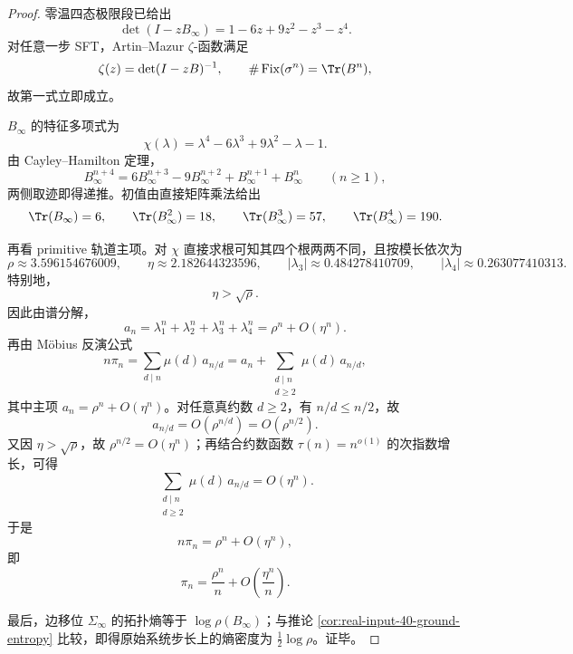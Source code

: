 \begin{proof}
零温四态极限段已给出
\[
\det(I-zB_\infty)=1-6z+9z^2-z^3-z^4.
\]
对任意一步 SFT，Artin--Mazur \(\zeta\)-函数满足
\[
\zeta(z)=\det(I-zB)^{-1},
\qquad
\#\operatorname{Fix}(\sigma^n)=\Tr(B^n),
\]
故第一式立即成立。

\(B_\infty\) 的特征多项式为
\[
\chi(\lambda)=\lambda^4-6\lambda^3+9\lambda^2-\lambda-1.
\]
由 Cayley--Hamilton 定理，
\[
B_\infty^{n+4}=6B_\infty^{n+3}-9B_\infty^{n+2}+B_\infty^{n+1}+B_\infty^{n}
\qquad(n\ge 1),
\]
两侧取迹即得递推。初值由直接矩阵乘法给出
\[
\Tr(B_\infty)=6,\qquad
\Tr(B_\infty^2)=18,\qquad
\Tr(B_\infty^3)=57,\qquad
\Tr(B_\infty^4)=190.
\]

再看 primitive 轨道主项。对 \(\chi\) 直接求根可知其四个根两两不同，且按模长依次为
\[
\rho\approx 3.596154676009,\qquad
\eta\approx 2.182644323596,\qquad
|\lambda_3|\approx 0.484278410709,\qquad
|\lambda_4|\approx 0.263077410313.
\]
特别地，
\[
\eta>\sqrt{\rho}.
\]
因此由谱分解，
\[
a_n=\lambda_1^n+\lambda_2^n+\lambda_3^n+\lambda_4^n
=
\rho^n+O(\eta^n).
\]
再由 Möbius 反演公式
\[
n\pi_n=\sum_{d\mid n}\mu(d)\,a_{n/d}
=
a_n+\sum_{\substack{d\mid n\\ d\ge 2}}\mu(d)\,a_{n/d},
\]
其中主项 \(a_n=\rho^n+O(\eta^n)\)。对任意真约数 \(d\ge 2\)，有 \(n/d\le n/2\)，故
\[
a_{n/d}=O(\rho^{n/d})=O(\rho^{n/2}).
\]
又因 \(\eta>\sqrt{\rho}\)，故 \(\rho^{n/2}=O(\eta^n)\)；再结合约数函数 \(\tau(n)=n^{o(1)}\) 的次指数增长，可得
\[
\sum_{\substack{d\mid n\\ d\ge 2}}\mu(d)\,a_{n/d}=O(\eta^n).
\]
于是
\[
n\pi_n=\rho^n+O(\eta^n),
\]
即
\[
\pi_n=\frac{\rho^n}{n}+O\!\left(\frac{\eta^n}{n}\right).
\]

最后，边移位 \(\Sigma_\infty\) 的拓扑熵等于 \(\log\rho(B_\infty)\)；与推论 \ref{cor:real-input-40-ground-entropy} 比较，即得原始系统步长上的熵密度为 \(\tfrac12\log\rho\)。证毕。
\end{proof}
